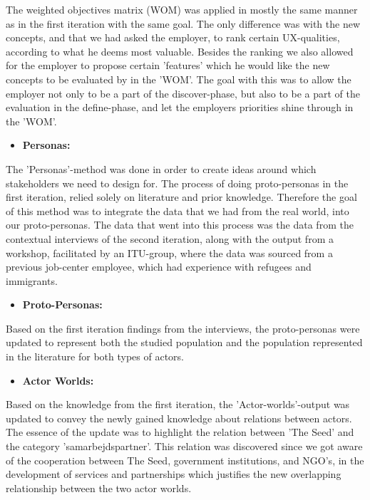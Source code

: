 The weighted objectives matrix (WOM) was applied in mostly the same manner as in the first iteration with the same goal. The only difference was with the new concepts, and that we had asked the employer, to rank certain UX-qualities, according to what he deems most valuable. Besides the ranking we also allowed for the employer to propose certain 'features' which he would like the new concepts to be evaluated by in the 'WOM'. The goal with this was to allow the employer not only to be a part of the discover-phase, but also to be a part of the evaluation in the define-phase, and let the employers priorities shine through in the 'WOM'.

\begin{itemize}
    \item \bf{Personas:}
\end{itemize}

The 'Personas'-method was done in order to create ideas around which stakeholders we need to design for. The process of doing proto-personas in the first iteration, relied solely on literature and prior knowledge. Therefore the goal of this method was to integrate the data that we had from the real world, into our proto-personas. The data that went into this process was the data from the contextual interviews of the second iteration, along with the output from a workshop, facilitated by an ITU-group, where the data was sourced from a previous job-center employee, which had experience with refugees and immigrants.

\begin{itemize}
    \item \bf{Proto-Personas:}
\end{itemize}

Based on the first iteration findings from the interviews, the proto-personas were updated to represent both the studied population and the population represented in the literature for both types of actors.

\begin{itemize}
    \item \bf{Actor Worlds:}
\end{itemize}

Based on the knowledge from the first iteration, the 'Actor-worlds'-output was updated to convey the newly gained knowledge about relations between actors. The essence of the update was to highlight the relation between 'The Seed' and the category 'samarbejdspartner'. This relation was discovered since we got aware of the cooperation between The Seed, government institutions, and NGO's, in the development of services and partnerships which justifies the new overlapping relationship between the two actor worlds.

